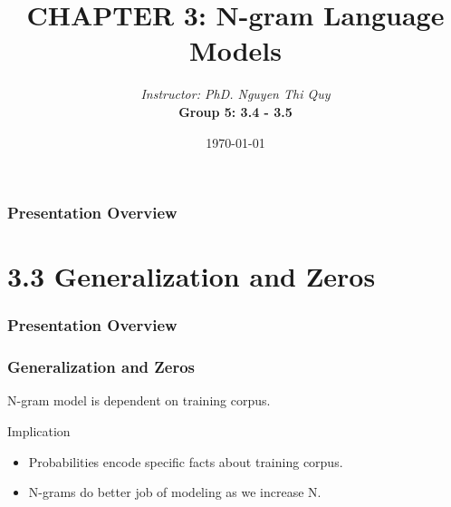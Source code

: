 \documentclass[13.5pt,aspecratio=169]{beamer}
\title{CHAPTER 3: N-gram Language Models}
\author[Group 5]{\textit{Instructor: PhD. Nguyen Thi Quy}\\ \bigskip \textbf{Group 5: 3.4 - 3.5}}
\date{\today}
\begin{document}
\maketitle



\begin{frame}
    \doublespacing
        \frametitle{Presentation Overview} %
        
        \tableofcontents %
\end{frame}
    
    
    \section{3.3 Generalization and Zeros} %
    \begin{frame}
        \doublespacing
            \frametitle{Presentation Overview} %
            
            \tableofcontents[currentsection] %
    \end{frame}


    \begin{frame}
        \frametitle{Generalization and Zeros}
     
            N-gram model is dependent on training corpus.
            
            \begin{block}{Implication}
                 \begin{itemize}
                   \item Probabilities encode specific facts about training corpus.
                   \item N-grams do better job of modeling as we increase N.
                \end{itemize}
            \end{block}
        
    \end{frame}
    
\end{document}
